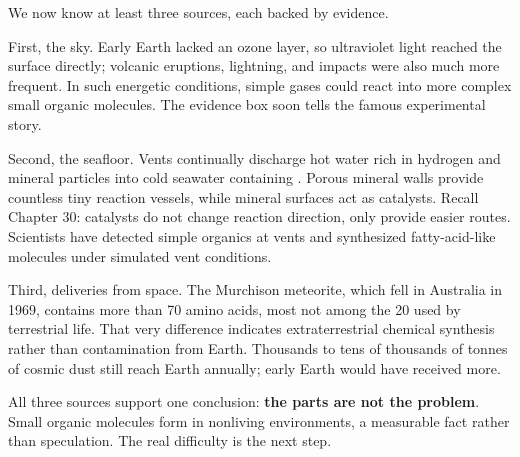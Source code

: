 We now know at least three sources, each backed by evidence.

First, the sky. Early Earth lacked an ozone layer, so ultraviolet light reached the surface directly; volcanic eruptions, lightning, and impacts were also much more frequent. In such energetic conditions, simple gases could react into more complex small organic molecules. The evidence box soon tells the famous experimental story.

Second, the seafloor. Vents continually discharge hot water rich in hydrogen and mineral particles into cold seawater containing . Porous mineral walls provide countless tiny reaction vessels, while mineral surfaces act as catalysts. Recall Chapter 30: catalysts do not change reaction direction, only provide easier routes. Scientists have detected simple organics at vents and synthesized fatty-acid-like molecules under simulated vent conditions.

Third, deliveries from space. The Murchison meteorite, which fell in Australia in 1969, contains more than 70 amino acids, most not among the 20 used by terrestrial life. That very difference indicates extraterrestrial chemical synthesis rather than contamination from Earth. Thousands to tens of thousands of tonnes of cosmic dust still reach Earth annually; early Earth would have received more.

All three sources support one conclusion: \textbf{the parts are not the problem}. Small organic molecules form in nonliving environments, a measurable fact rather than speculation. The real difficulty is the next step.

